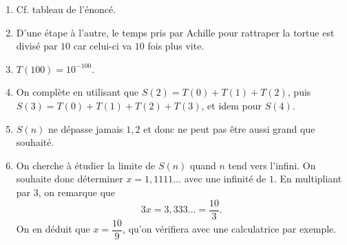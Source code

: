 {	\begin{enumerate}
		\item Cf. tableau de l'énoncé.
		\item D'une étape à l'autre, le temps pris par Achille pour rattraper la tortue est divisé par $10$ car celui-ci va $10$ fois plus vite.
		\item $T(100) = 10^{-100}$.
		\item On complète en utilisant que $S(2) = T(0) + T(1) + T(2)$, puis $S(3) = T(0) + T(1) + T(2) + T(3)$, et idem pour $S(4)$.
		\item 
		$S(n)$ ne dépasse jamais $1,2$ et donc ne peut pas être aussi grand que souhaité.
		\item 
		On cherche à étudier la limite de $S(n)$ quand $n$ tend vers l'infini.
		On souhaite donc déterminer $x = 1,1111\dots$ avec une infinité de $1$.
		En multipliant par $3$, on remarque que
			\[ 3x = 3,333\dots = \dfrac{10}3. \]
		On en déduit que $x= \dfrac{10}9$, qu'on vérifiera avec une calculatrice par exemple.
	\end{enumerate}

}

